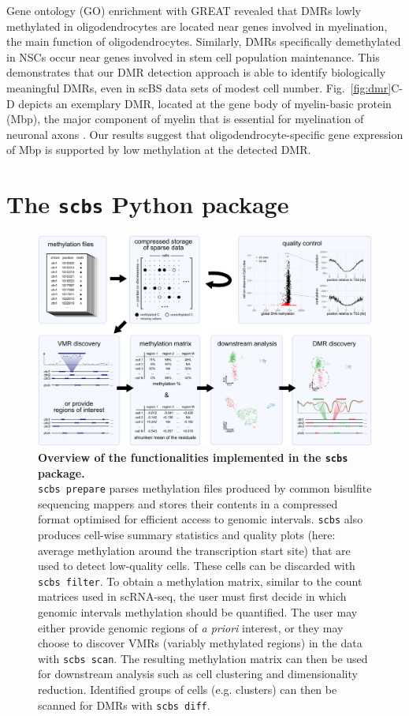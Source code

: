 \documentclass[twocolumn,10pt]{article}
\begin{document}
Gene ontology (GO) enrichment with GREAT \citep{mclean2010great} revealed that DMRs lowly methylated in oligodendrocytes are located near genes involved in myelination, the main function of oligodendrocytes.
Similarly, DMRs specifically demethylated in NSCs occur near genes involved in stem cell population maintenance.
This demonstrates that our DMR detection approach is able to identify biologically meaningful DMRs, even in scBS data sets of modest cell number.
Fig.~\ref{fig:dmr}C-D depicts an exemplary DMR, located at the gene body of myelin-basic protein (Mbp), the major component of myelin that is essential for myelination of neuronal axons \citep{mbp}.
Our results suggest that oligodendrocyte-specific gene expression of Mbp is supported by low methylation at the detected DMR.


\section{The \texttt{scbs} Python package}

\begin{figure}[t]
    \begin{center}
        \includegraphics[width=.8\textwidth]{figures/Fig_workflow.png}
    \end{center}
    \caption{\small \textbf{Overview of the functionalities implemented in the \texttt{scbs} package.}\\
        \texttt{scbs prepare} parses methylation files produced by common bisulfite sequencing mappers and stores their contents in a compressed format optimised for efficient access to genomic intervals.
        \texttt{scbs} also produces cell-wise summary statistics and quality plots (here: average methylation around the transcription start site) that are used to detect low-quality cells.
        These cells can be discarded with \texttt{scbs filter}.
        To obtain a methylation matrix, similar to the count matrices used in scRNA-seq, the user must first decide in which genomic intervals methylation should be quantified.
        The user may either provide genomic regions of \emph{a priori} interest, or they may choose to discover VMRs (variably methylated regions) in the data with \texttt{scbs scan}.
        The resulting methylation matrix can then be used for downstream analysis such as cell clustering and dimensionality reduction.
        Identified groups of cells (e.g. clusters) can then be scanned for DMRs with \texttt{scbs diff}.
    }
    \label{fig:workflow}
\end{figure}
\end{document}
